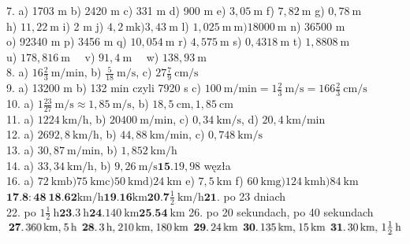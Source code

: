 \documentclass[10pt]{article}
\begin{document}
7. a) 1703 m b) 2420 m c) 331 m d) 900 m e) \(3,05 \mathrm{~m}\) f) \(7,82 \mathrm{~m}\) g) \(0,78 \mathrm{~m}\)\\
h) \(11,22 \mathrm{~m}\) i) 2 m j) \(4,2 \mathrm{~m} \mathrm{k)} 3,43 \mathrm{~m}\) l) \(1,025 \mathrm{~m} \mathrm{~m}) 18000 \mathrm{~m}\) n) 36500 m\\
o) 92340 m p) 3456 m q) \(10,054 \mathrm{~m}\) r) \(4,575 \mathrm{~m}\) s) \(0,4318 \mathrm{~m}\) t) \(1,8808 \mathrm{~m}\)\\
u) \(178,816 \mathrm{~m} \quad\) v) \(91,4 \mathrm{~m} \quad\) w) \(138,93 \mathrm{~m}\)\\
8. a) \(16 \frac{2}{3} \mathrm{~m} / \mathrm{min}\), b) \(\frac{5}{18} \mathrm{~m} / \mathrm{s}\), c) \(27 \frac{7}{9} \mathrm{~cm} / \mathrm{s}\)\\
9. a) 13200 m b) 132 min czyli 7920 s c) \(100 \mathrm{~m} / \mathrm{min}=1 \frac{2}{3} \mathrm{~m} / \mathrm{s}=166 \frac{2}{3} \mathrm{~cm} / \mathrm{s}\)\\
10. a) \(1 \frac{23}{27} \mathrm{~m} / \mathrm{s} \approx 1,85 \mathrm{~m} / \mathrm{s}\), b) \(18,5 \mathrm{~cm}, 1,85 \mathrm{~cm}\)\\
11. a) \(1224 \mathrm{~km} / \mathrm{h}\), b) \(20400 \mathrm{~m} / \mathrm{min}\), c) \(0,34 \mathrm{~km} / \mathrm{s}\), d) \(20,4 \mathrm{~km} / \mathrm{min}\)\\
12. a) \(2692,8 \mathrm{~km} / \mathrm{h}\), b) \(44,88 \mathrm{~km} / \mathrm{min}\), c) \(0,748 \mathrm{~km} / \mathrm{s}\)\\
13. a) \(30,87 \mathrm{~m} / \mathrm{min}\), b) \(1,852 \mathrm{~km} / \mathrm{h}\)\\
14. a) \(33,34 \mathrm{~km} / \mathrm{h}\), b) \(9,26 \mathrm{~m} / \mathrm{s} \mathbf{1 5} .19,98\) węzła\\
16. a) \(72 \mathrm{~km} \mathrm{b)} 75 \mathrm{~km} \mathrm{c)} 50 \mathrm{~km} \mathrm{d)} 24 \mathrm{~km}\) e) \(7,5 \mathrm{~km}\) f) \(60 \mathrm{~km} \mathrm{g)} 124 \mathrm{~km} \mathrm{h)} 84 \mathrm{~km}\)\\
\(\mathbf{1 7 . 8 : 4 8 ~} \mathbf{1 8 . 6 2} \mathrm{km} / \mathrm{h} \mathbf{1 9 . 1 6} \mathrm{km} \mathbf{2 0 . 7} \frac{1}{2} \mathrm{~km} / \mathrm{h} \mathbf{2 1}\). po 23 dniach\\
22. po \(1 \frac{1}{2} \mathrm{~h} \mathbf{2 3} .3 \mathrm{~h} \mathbf{2 4} .140 \mathrm{~km} \mathbf{2 5 . 5 4} \mathrm{~km}\) 26. po 20 sekundach, po 40 sekundach\\
\includegraphics[max width=\textwidth, center]{2024_11_21_8f01584889ff06348ae7g-063}\\
\end{document}
